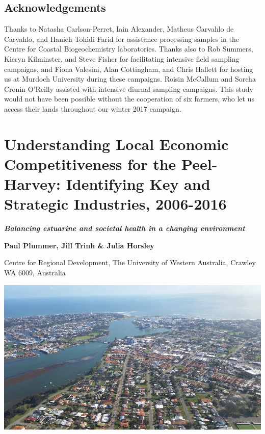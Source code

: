 \documentclass[
]{book}
\begin{document}
\hypertarget{acknowledgements-4}{%
\section{Acknowledgements}\label{acknowledgements-4}}

Thanks to Natasha Carlson-Perret, Iain Alexander, Matheus Carvahlo de Carvahlo, and Hanieh Tohidi Farid for assistance processing samples in the Centre for Coastal Biogeochemistry laboratories. Thanks also to Rob Summers, Kieryn Kilminster, and Steve Fisher for facilitating intensive field sampling campaigns, and Fiona Valesini, Alan Cottingham, and Chris Hallett for hosting us at Murdoch University during these campaigns. Roisin McCallum and Sorcha Cronin-O'Reilly assisted with intensive diurnal sampling campaigns. This study would not have been possible without the cooperation of six farmers, who let us access their lands throughout our winter 2017 campaign.~

\hypertarget{understanding-local-economic-competitiveness-for-the-peel-harvey-identifying-key-and-strategic-industries-2006-2016}{%
\chapter{Understanding Local Economic Competitiveness for the Peel-Harvey: Identifying Key and Strategic Industries, 2006-2016}\label{understanding-local-economic-competitiveness-for-the-peel-harvey-identifying-key-and-strategic-industries-2006-2016}}

{\textbf{\emph{Balancing estuarine and societal health in a changing environment}}}

{\textbf{Paul Plummer, Jill Trinh \& Julia Horsley}}

{Centre for Regional Development, The University of Western Australia, Crawley WA 6009, Australia}

\includegraphics[width=1\linewidth]{images/economic_competitiveness/picture1}
\end{document}
